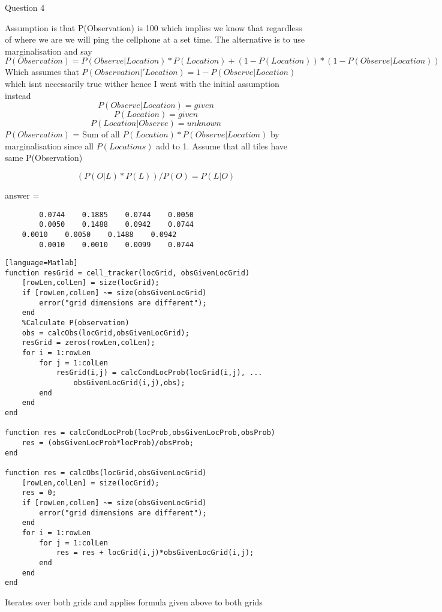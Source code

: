 \documentclass[12pt]{article}
\begin{document}
\begin{flushleft}
Question 4

	Assumption is that P(Observation) is 100 which implies we know that regardless of where we are we will ping the cellphone at a set time. The alternative is to use marginalisation and say 
	\[P(Observation) = P(Observe \vert Location)* P(Location) + (1 - P(Location))*(1 - P(Observe \vert Location))\]
	Which assumes that $P(Observation \vert 'Location) = 1 -  P(Observe \vert Location)$ which isnt necessarily true wither hence I went with the initial assumption instead
	\[ P(Observe \vert Location) = given \]
	\[ P(Location) = given \]
	\[ P(Location \vert Observe) = unknown \]
	$ P(Observation)$ = Sum of all $P(Location)*P(Observe \vert Location)$ by marginalisation since all $P(Locations)$ add to 1.
	Assume that all  tiles have same P(Observation) 
	
	\[ (P(O \vert L)*P(L))/P(O) = P(L \vert O) \]
	
	answer = 
	\begin{verbatim}
    	0.0744    0.1885    0.0744    0.0050
    	0.0050    0.1488    0.0942    0.0744
   	0.0010    0.0050    0.1488    0.0942
    	0.0010    0.0010    0.0099    0.0744
    	\end{verbatim}
    	
\begin{minipage}{\textwidth}
\begin{lstlisting}[tabsize=4][language=Matlab]
function resGrid = cell_tracker(locGrid, obsGivenLocGrid)
    [rowLen,colLen] = size(locGrid);
    if [rowLen,colLen] ~= size(obsGivenLocGrid)
        error("grid dimensions are different");
    end
    %Calculate P(observation)
    obs = calcObs(locGrid,obsGivenLocGrid);
    resGrid = zeros(rowLen,colLen);
    for i = 1:rowLen
        for j = 1:colLen
            resGrid(i,j) = calcCondLocProb(locGrid(i,j), ...
                obsGivenLocGrid(i,j),obs);
        end
    end
end

function res = calcCondLocProb(locProb,obsGivenLocProb,obsProb)
    res = (obsGivenLocProb*locProb)/obsProb;
end

function res = calcObs(locGrid,obsGivenLocGrid)
    [rowLen,colLen] = size(locGrid);
    res = 0;
    if [rowLen,colLen] ~= size(obsGivenLocGrid)
        error("grid dimensions are different");
    end
    for i = 1:rowLen
        for j = 1:colLen
            res = res + locGrid(i,j)*obsGivenLocGrid(i,j);
        end
    end
end
\end{lstlisting}
\end{minipage}

Iterates over both grids and applies formula given above to both grids
	
\end{flushleft}
\end{document}
